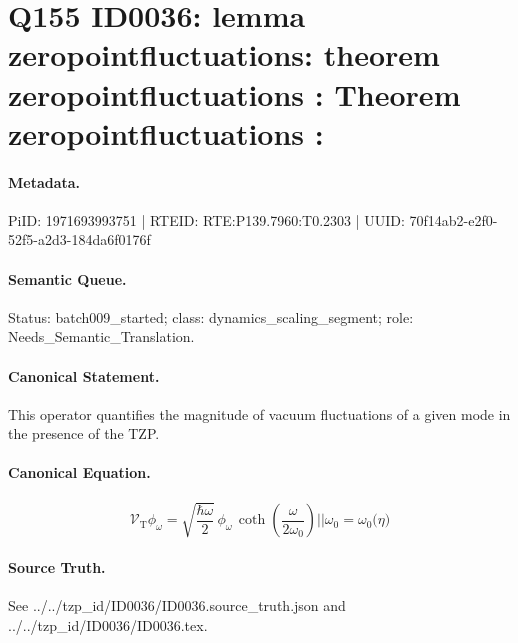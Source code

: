 \section*{Q155 ID0036: lemma zeropointfluctuations: theorem zeropointfluctuations : Theorem zeropointfluctuations :}
\paragraph{Metadata.}
PiID: 1971693993751 | RTEID: RTE:P139.7960:T0.2303 | UUID: 70f14ab2-e2f0-52f5-a2d3-184da6f0176f

\paragraph{Semantic Queue.}
Status: batch009\_started; class: dynamics\_scaling\_segment; role: Needs\_Semantic\_Translation.

\paragraph{Canonical Statement.}
This operator quantifies the magnitude of vacuum fluctuations of a given mode in the presence of the TZP.

\paragraph{Canonical Equation.}
\[
\mathcal{V}_{\mathrm{T}}\phi_{\omega} = \sqrt{\frac{\hbar\omega}{2}}\, \phi_{\omega}\, \coth\!\left( \frac{\omega}{2\omega_{0}} \right) || \omega_{0}=\omega_{0}\bigl(\eta\bigr)
\]

\paragraph{Source Truth.}
See ../../tzp\_id/ID0036/ID0036.source\_truth.json and ../../tzp\_id/ID0036/ID0036.tex.
